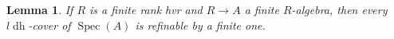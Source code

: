 \documentclass[10pt]{amsart}
\newtheorem{lemm}[theo]{Lemma}
\theoremstyle{definition}
\DeclareMathOperator{\Spec}{Spec}
\newcommand{\ldh}{{l{\operatorname{dh}}}}
\newcommand{\cduh}{\operatorname{cduh}}
\begin{document}
%


\begin{lemm} \label{lemm:finhvrrefine}
If $R$ is a finite rank hvr and $R \to A$ a finite $R$-algebra, then every $\ldh$-cover of $\Spec(A)$ is refinable by a finite one.
\end{lemm}
\end{document}
